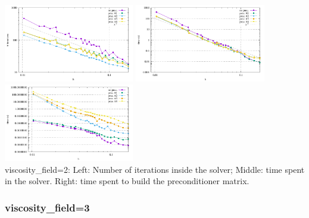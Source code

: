 \begin{center} 
\includegraphics[width=5.7cm]{python_codes/fieldstone_16/results/visc_field_2/niterations.pdf}
\includegraphics[width=5.7cm]{python_codes/fieldstone_16/results/visc_field_2/solve_time.pdf}
\includegraphics[width=5.7cm]{python_codes/fieldstone_16/results/visc_field_2/build_precond.pdf}\\
{\captionfont viscosity\_field=2: Left: Number of iterations inside the solver; 
Middle: time spent in the solver.
Right: time spent to build the preconditioner matrix.
}\end{center} 


\newpage
\subsubsection{viscosity\_field=3}

